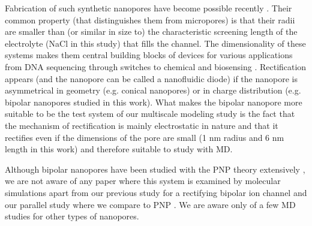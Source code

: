 \documentclass[fleqn,10pt]{SelfArx} %
\begin{document}
Fabrication of such synthetic nanopores have become possible recently \cite{siwy_prl_2002,siwy_ss_2003,siwy_nim_2003,howorka_siwy_chapt11_2009,guo_acr_2013,gibb_chapter_2013,guan_nanotech_2014,zhang_nanotoday_2016}. 
Their common property (that distinguishes them from micropores) is that their radii are smaller than (or similar in size to) the characteristic screening length of the electrolyte (NaCl in this study) that fills the channel.
The dimensionality of these systems makes them central building blocks of devices for various applications from DNA sequencing \cite{otto_chapter_2013} through switches \cite{wang_cs_2017}  to chemical and biosensing \cite{sexton_mbs_2007,howorka_csr_2009,piruska_csr_2010,howorka_nbt_2012}.  
Rectification appears (and the nanopore can be called a nanofluidic diode) if the nanopore is asymmetrical in geometry (e.g. conical nanopores) or in charge distribution (e.g. bipolar nanopores studied in this work). 
What makes the bipolar nanopore more suitable to be the test system of our multiscale modeling study is the fact that the mechanism of rectification is mainly electrostatic in nature and that it rectifies even if the dimensions of the pore are small (1 nm radius and 6 nm length in this work) and therefore suitable to study with MD. 

Although bipolar nanopores have been studied with the PNP theory extensively \cite{daiguji_nl_2005,constantin_pre_2007,vlassiouk_nl_2007,karnik_nl_2007,vlassiouk_acsnanno_2008,kalman_am_2008,yan_nl_2009,nguyen_nt_2010,szymczyk_jpcb_2010,singh_jap_2011,singh_jpcb_2011,singh_apl_2011,van_oeffelen_plosone_2015,tajparast_bba_2015}, we are not aware of any paper where this system is examined by molecular simulations apart from our previous study for a rectifying bipolar ion channel \cite{hato-cmp-19-13802-2016} and our parallel study where we compare to PNP \cite{matejczyk-jcp-submitted-2017}. 
We are aware only of a few MD studies \cite{aksimentiev_ieee_2009,cruzchu_fd_2009,cruzchu_jpcc_2009,chen_small_2011,gamble_jpcc_2014,ge_ms_2016} for other types of nanopores.

\end{document}
